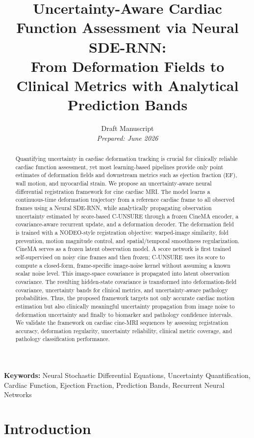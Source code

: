 \documentclass[10pt,twocolumn]{article}
\title{\Large \textbf{Uncertainty-Aware Cardiac Function Assessment via Neural SDE-RNN: \\From Deformation Fields to Clinical Metrics with Analytical Prediction Bands}}
\author{
Draft Manuscript \\
\textit{Prepared: June 2026}
}
\date{}
\begin{document}
\maketitle

\begin{abstract}
Quantifying uncertainty in cardiac deformation tracking is crucial for clinically reliable cardiac function assessment, yet most learning-based pipelines provide only point estimates of deformation fields and downstream metrics such as ejection fraction (EF), wall motion, and myocardial strain. We propose an uncertainty-aware neural differential registration framework for cine cardiac MRI. The model learns a continuous-time deformation trajectory from a reference cardiac frame to all observed frames using a Neural SDE-RNN, while analytically propagating observation uncertainty estimated by score-based C-UNSURE through a frozen CineMA encoder, a covariance-aware recurrent update, and a deformation decoder. The deformation field is trained with a NODEO-style registration objective: warped-image similarity, fold prevention, motion magnitude control, and spatial/temporal smoothness regularization. CineMA serves as a frozen latent observation model. A score network is first trained self-supervised on noisy cine frames and then frozen; C-UNSURE uses its score to compute a closed-form, frame-specific image-noise kernel without assuming a known scalar noise level. This image-space covariance is propagated into latent observation covariance. The resulting hidden-state covariance is transformed into deformation-field covariance, uncertainty bands for clinical metrics, and uncertainty-aware pathology probabilities. Thus, the proposed framework targets not only accurate cardiac motion estimation but also clinically meaningful uncertainty propagation from image noise to deformation uncertainty and finally to biomarker and pathology confidence intervals. We validate the framework on cardiac cine-MRI sequences by assessing registration accuracy, deformation regularity, uncertainty reliability, clinical metric coverage, and pathology classification performance.
\end{abstract}

\textbf{Keywords:} Neural Stochastic Differential Equations, Uncertainty Quantification, Cardiac Function, Ejection Fraction, Prediction Bands, Recurrent Neural Networks

\section{Introduction}
\label{sec:intro}
\end{document}
